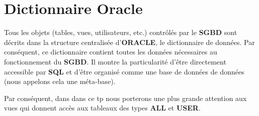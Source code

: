 \chapter{Dictionnaire Oracle}

\par Tous les objets (tables, vues, utilisateurs, etc.) contrôlés par le \textbf{SGBD} sont décrits dans la structure centralisée d’\textbf{ORACLE}, le dictionnaire de données.
Par conséquent, ce dictionnaire contient toutes les données nécessaires au fonctionnement du \textbf{SGBD}.
Il montre la particularité d’être directement accessible par \textbf{SQL} et d’être organisé comme une base de données de données (nous appelons cela une méta-base). 
\par Par conséquent, dans dans ce tp nous porterons une plus grande attention aux vues qui donnent accès aux tableaux des types \textbf{ALL} et \textbf{USER}.



